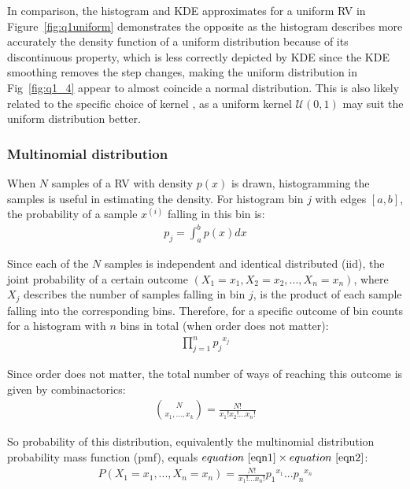 \documentclass[11pt, twocolumn]{article}
\begin{document}
\vspace{-1em}
In comparison, the histogram and KDE approximates for a uniform RV in Figure~\ref{fig:q1uniform} demonstrates the opposite as the histogram describes more accurately the density function of a uniform distribution because of its discontinuous property, which is less correctly depicted by KDE since the KDE smoothing removes the step changes, making the uniform distribution in Fig~\ref{fig:q1_4} appear to almost coincide a normal distribution.
This is also likely related to the specific choice of kernel
, as a uniform kernel $\mathcal{U}(0, 1)$ may suit the uniform distribution better.

\subsubsection{Multinomial distribution}
When $N$ samples of a RV with density $p(x)$ is drawn, histogramming the samples is useful in estimating the density. For histogram bin $j$ with edges $[a, b]$, the probability of a sample $x^{(i)}$ falling in this bin is:
\vspace{-0.75em}
\begin{align*}
    p_j=\int_{a}^{b}p(x)dx
\end{align*}
\vspace{-0.75em}

Since each of the $N$ samples is independent and identical distributed (iid), the joint probability of a certain outcome $(X_1=x_1, X_2=x_2, ..., X_n=x_n)$, where $X_j$ describes the number of samples falling in bin $j$, is the product of each sample falling into the corresponding bins.
Therefore, for a specific outcome of bin counts for a histogram with $n$ bins in total (when order does not matter):
\vspace{-0.75em}
\begin{align}
    \prod_{j=1}^{n}{p_j}^{x_j}
    \label{eqn1}
\end{align}


Since order does not matter, the total number of ways of reaching this outcome is given by combinactorics:
\begin{align}
    \binom{N}{x_1, ..., x_k} = \frac{N!}{x_1!x_2!...x_n!}
    \label{eqn2}
\end{align}
\vspace{-0.75em}

So probability of this distribution, equivalently the multinomial distribution probability mass function (pmf), equals $equation~\ref{eqn1}\times equation~\ref{eqn2}$:
\begin{align*}
    P(X_1=x_1, ..., X_n=x_n)=\frac{N!}{x_1!...x_n!}{{p_1}^{x_1}...{p_n}^{x_n}}
\end{align*}
\end{document}
